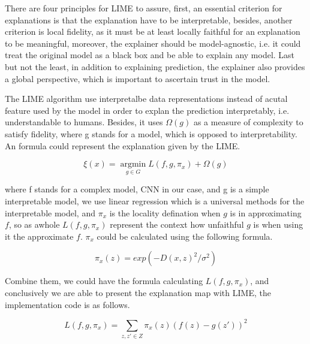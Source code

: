 \documentclass[conference]{IEEEtran}
\begin{document}
There are four principles for LIME to assure, first, an essential criterion for explanations is that the explanation have to be interpretable, besides, another criterion is local fidelity, as it must be at least locally faithful for an explanation to be meaningful, moreover, the explainer should be model-agnostic, i.e. it could treat the original model as a black box and be able to explain any model. Last but not the least, in addition to explaining prediction, the explainer also provides a global perspective, which is important to ascertain trust in the model.

The LIME algorithm use interpretalbe data representations instead of acutal feature used by the model in order to explan the prediction interpretably, i.e. understandable to humans. Besides, it uses $\Omega(g)$ as a measure of complexity to satisfy fidelity, where g stands for a model, which is opposed to interpretability. An formula could represent the explanation given by the LIME.

$$\xi(x)=\mathop{argmin}\limits_{g\in{G}}L(f,g,{\pi}_{x})+{\Omega}(g)$$

where f stands for a complex model, CNN in our case, and g is a simple interpretable model, we use linear regression which is a universal methods for the interpretable model, and ${\pi}_{x}$ is the locality defination when $g$ is in approximating $f$, so as awhole $L(f,g,{\pi}_{x})$ represent the context how unfaithful $g$ is when using it the approximate $f$. ${\pi}_{x}$ could be calculated using the following formula.

$${\pi}_{x}(z)=exp(-D{(x,z)}^{2}/{\sigma}^2)$$

Combine them, we could have the formula calculating $L(f,g,{\pi}_{x})$, and conclusively we are able to present the explanation map with LIME, the implementation code is as follows.

$$L(f,g,{\pi}_{x})=\sum_{z,z'{\in}Z}{\pi}_{x}(z){(f(z)-g(z'))}^2$$
\end{document}
